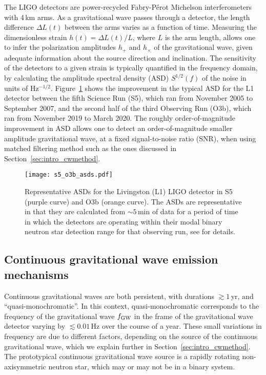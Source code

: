 The LIGO detectors are power-recycled Fabry-Pérot Michelson interferometers with 4\,km arms. As a gravitational wave passes through a detector, the length difference $\Delta L(t)$ between the arms varies as a function of time. Measuring the dimensionless strain $h(t) = \Delta L(t) / L$, where $L$ is the arm length, allows one to infer the polarization amplitudes $h_+$ and $h_\times$ of the gravitational wave, given adequate information about the source direction and inclination. The sensitivity of the detectors to a given strain is typically quantified in the frequency domain, by calculating the amplitude spectral density (ASD) $S^{1/2}(f)$ of the noise in units of Hz$^{-1/2}$. Figure~\ref{fig:asds} shows the improvement in the typical ASD for the L1 detector between the fifth Science Run (S5), which ran from November 2005 to September 2007, and the second half of the third Observing Run (O3b), which ran from November 2019 to March 2020. The roughly order-of-magnitude improvement in ASD allows one to detect an order-of-magnitude smaller amplitude gravitational wave, at a fixed signal-to-noise ratio (SNR), when using matched filtering method such as the ones discussed in Section~\ref{sec:intro_cwmethod}.

\begin{figure}
    \centering
    \texttt{[image: s5\_o3b\_asds.pdf]}
    \caption{Representative ASDs for the Livingston (L1) LIGO detector in S5 (purple curve) and O3b (orange curve). The ASDs are representative in that they are calculated from $\sim5\,$min of data for a period of time in which the detectors are operating within their modal binary neutron star detection range for that observing run, see \citet{Weinstein2010,o3b_asd} for details.} \label{fig:asds}
\end{figure}

\subsection{Continuous gravitational wave emission mechanisms} \label{sec:intro_emiss}
Continuous gravitational waves are both persistent, with durations $\gtrsim 1\,$yr, and ``quasi-monochromatic''. In this context, quasi-monochromatic corresponds to the frequency of the gravitational wave $f_{\rm GW}$ in the frame of the gravitational wave detector varying by $\lesssim0.01\,$Hz over the course of a year. These small variations in frequency are due to different factors, depending on the source of the continuous gravitational wave, which we explain further in Section~\ref{sec:intro_cwmethod}. The prototypical continuous gravitational wave source is a rapidly rotating non-axisymmetric neutron star, which may or may not be in a binary system. 

